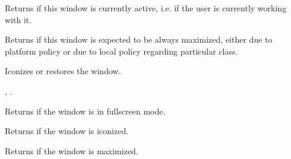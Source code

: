 \label{wxtoplevelwindowisactive}


Returns \true if this window is currently active, i.e. if the user is currently
working with it.


\label{wxtoplevelwindowisalwaysmaximized}


Returns \true if this window is expected to be always maximized, either due to platform policy
or due to local policy regarding particular class.


\label{wxtoplevelwindowiconize}


Iconizes or restores the window.




, .


\label{wxtoplevelwindowisfullscreen}


Returns \true if the window is in fullscreen mode.




\label{wxtoplevelwindowisiconized}


Returns \true if the window is iconized.


\label{wxtoplevelwindowismaximized}


Returns \true if the window is maximized.


\label{wxtoplevelwindowisusingnativedecorations}

